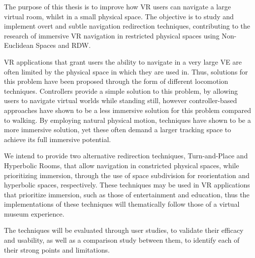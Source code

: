 
%

The purpose of this thesis is to improve how \gls{VR} users can navigate a large virtual room, whilst in a small physical space. 
The objective is to study and implement overt and subtle navigation redirection techniques, contributing to the research 
of immersive \gls{VR} navigation in restricted physical spaces using Non-Euclidean Spaces and \gls{RDW}.

\gls{VR} applications that grant users the ability to navigate in a very large \gls{VE} are often limited by the physical space in which they are 
used in. Thus, solutions for this problem have been proposed through the form of different locomotion techniques. Controllers provide 
a simple solution to this problem, by allowing users to navigate virtual worlds while standing still, 
however controller-based approaches have shown 
to be a less immersive solution for this problem compared to walking. 
By employing natural physical motion,  techniques have shown to be a more immersive solution, 
yet these often demand a larger tracking space to achieve its full immersive potential.

We intend to provide two alternative redirection techniques, Turn-and-Place and Hyperbolic Rooms, that allow navigation in constricted physical spaces, while prioritizing immersion, 
through the use of space subdivision for reorientation and hyperbolic spaces, respectively. 
These techniques may be used in \gls{VR} applications that prioritize immersion, such as those of entertainment and education, thus 
the implementations of these techniques will thematically follow those of a virtual museum experience.

The techniques will be evaluated through user studies, to validate their efficacy and usability, as well as a comparison study between them, 
to identify each of their strong points and limitations.

